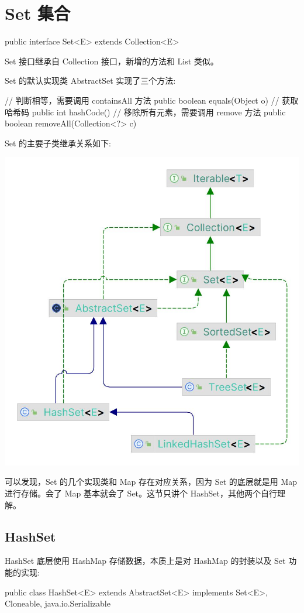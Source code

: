 \section{Set 集合}

\begin{Java}
public interface Set<E> extends Collection<E>
\end{Java}

Set 接口继承自 Collection 接口，新增的方法和 List 类似。

Set 的默认实现类 AbstractSet 实现了三个方法:

\begin{Java}
// 判断相等，需要调用 containsAll 方法
public boolean equals(Object o)
// 获取哈希码
public int hashCode()
// 移除所有元素，需要调用 remove 方法
public boolean removeAll(Collection<?> c)
\end{Java}

Set 的主要子类继承关系如下:

\begin{center}
    \includegraphics[width=0.5\linewidth]{../../imgs/Set.jpg}
\end{center}

可以发现，Set 的几个实现类和 Map 存在对应关系，因为 Set 的底层就是用 Map 进行存储。会了 Map 基本就会了 Set。这节只讲个 HashSet，其他两个自行理解。

\subsection{HashSet}

HashSet 底层使用 HashMap 存储数据，本质上是对 HashMap 的封装以及 Set 功能的实现:

\begin{Java}
public class HashSet<E> extends AbstractSet<E> implements Set<E>, Cloneable, java.io.Serializable
\end{Java}

